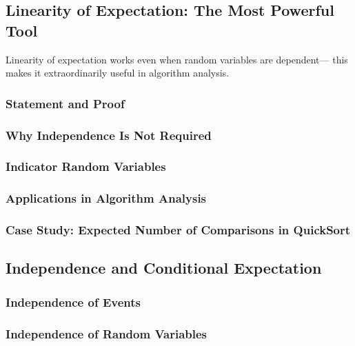 \subsection{Linearity of Expectation: The Most Powerful Tool}
\label{subsec:linearity-expectation}

\begin{subsectionintro}
Linearity of expectation works even when random variables are dependent—
this makes it extraordinarily useful in algorithm analysis.
\end{subsectionintro}

\subsubsection{Statement and Proof}

\subsubsection{Why Independence Is Not Required}

\subsubsection{Indicator Random Variables}

\subsubsection{Applications in Algorithm Analysis}

\subsubsection{Case Study: Expected Number of Comparisons in QuickSort}

\subsection{Independence and Conditional Expectation}
\label{subsec:independence}

\subsubsection{Independence of Events}
\subsubsection{Independence of Random Variables}
